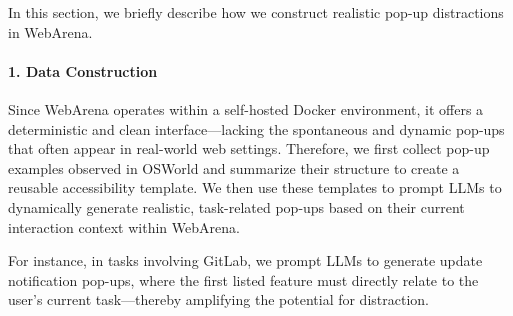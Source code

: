 In this section, we briefly describe how we construct realistic pop-up distractions in WebArena.

\paragraph{1. Data Construction} Since WebArena operates within a self-hosted Docker environment, it offers a deterministic and clean interface---lacking the spontaneous and dynamic pop-ups that often appear in real-world web settings. Therefore, we first collect pop-up examples observed in OSWorld and summarize their structure to create a reusable accessibility template. We then use these templates to prompt LLMs to dynamically generate realistic, task-related pop-ups based on their current interaction context within WebArena.

For instance, in tasks involving GitLab, we prompt LLMs to generate update notification pop-ups, where the first listed feature must directly relate to the user's current task---thereby amplifying the potential for distraction.

